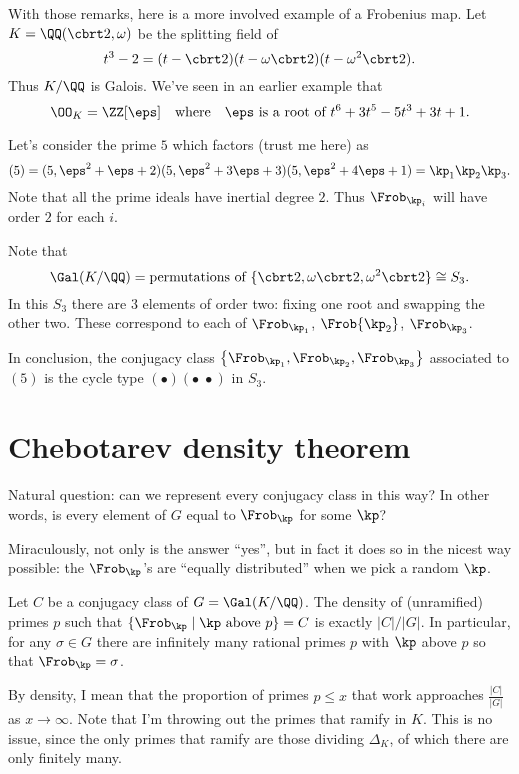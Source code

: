 \begin{example}
	With those remarks, here is a more involved example of a Frobenius map.
	Let $K = \QQ(\cbrt2, \omega)$ be the splitting field of
	\[ t^3-2 = (t-\cbrt2)(t-\omega\cbrt2)(t-\omega^2\cbrt2). \]
	Thus $K/\QQ$ is Galois.
	We've seen in an earlier example that
	\[ \OO_K = \ZZ[\eps] \quad\text{where}\quad \eps \text { is a root of } t^6+3t^5-5t^3+3t+1. \]

	Let's consider the prime $5$ which factors (trust me here) as
	\[ (5) = (5, \eps^2+\eps+2)(5, \eps^2+3\eps+3)(5, \eps^2+4\eps+1)
		= \kp_1 \kp_2 \kp_3. \]
	Note that all the prime ideals have inertial degree $2$.
	Thus $\Frob_{\kp_i}$ will have order $2$ for each $i$.

	Note that
	\[ \Gal(K/\QQ) =
		\text{permutations of } \{\cbrt2,\omega\cbrt2,\omega^2\cbrt2\}
		\cong S_3.  \]
	In this $S_3$ there are $3$ elements of order two:
	fixing one root and swapping the other two.
	These correspond to each of $\Frob_{\kp_1}$, $\Frob{\kp_2}$, $\Frob_{\kp_3}$.

	In conclusion, the conjugacy class
	$\left\{ \Frob_{\kp_1}, \Frob_{\kp_2}, \Frob_{\kp_3} \right\}$
	associated to $(5)$ is the
	cycle type $(\bullet)(\bullet \; \bullet)$ in $S_3$.
\end{example}


\section{Chebotarev density theorem}
Natural question: can we represent every conjugacy class in this way?
In other words, is every element of $G$ equal to $\Frob_\kp$ for some $\kp$?

Miraculously, not only is the answer ``yes'', but in fact it does so in the nicest way possible:
the $\Frob_\kp$'s are ``equally distributed'' when we pick a random $\kp$.
\begin{theorem}
	Let $C$ be a conjugacy class of $G = \Gal(K/\QQ)$.
	The density of (unramified) primes $p$ such that $\{ \Frob_\kp \mid \kp \text{ above } p \} = C$
	is exactly $\left\lvert C \right\rvert / \left\lvert G \right\rvert$.
	In particular, for any $\sigma \in G$ there are infinitely many rational primes $p$
	with $\kp$ above $p$ so that $\Frob_{\kp} = \sigma$.
\end{theorem}

By density, I mean that the proportion of primes $p \le x$ that work
approaches $\frac{\left\lvert C \right\rvert}{\left\lvert G \right\rvert}$ as $x \to \infty$.
Note that I'm throwing out the primes that ramify in $K$.
This is no issue, since the only primes that ramify are those dividing $\Delta_K$,
of which there are only finitely many.

